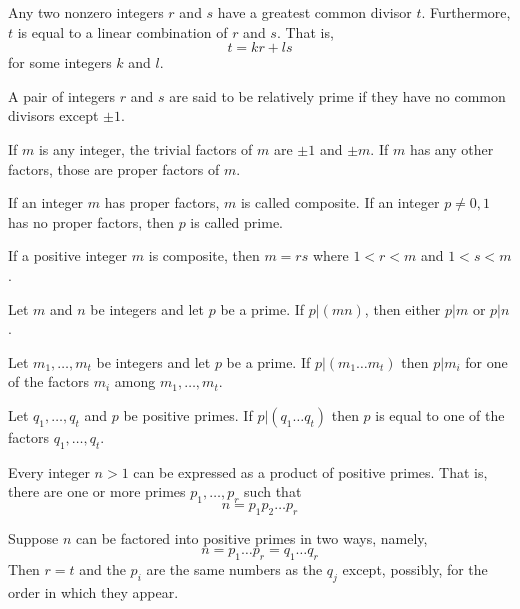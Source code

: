 \documentclass[12pt]{article}
\begin{document}
\begin{theorem} Any two nonzero integers $r$ and $s$ have a greatest common divisor $t$. Furthermore, $t$ is equal to a linear combination of $r$ and $s$. That is, $$t = kr + ls$$ for some integers $k$ and $l$. \end{theorem} 

\begin{definition} A pair of integers $r$ and $s$ are said to be relatively prime if they have no common divisors except $\pm 1$. \end{definition} 

\begin{definition} If $m$ is any integer, the trivial factors of $m$ are $\pm 1$ and $\pm m$. If $m$ has any other factors, those are proper factors of $m$. \end{definition} 

\begin{definition} If an integer $m$ has proper factors, $m$ is called composite. If an integer $p \neq 0, 1$ has no proper factors, then $p$ is called prime. \end{definition} 

\begin{theorem} If a positive integer $m$ is composite, then $m = rs$ where $1 < r < m$ and $1 < s < m$. \end{theorem} 

\begin{theorem} Let $m$ and $n$ be integers and let $p$ be a prime. If $p| (mn)$, then either $p|m$ or $p|n$. \end{theorem} 

\begin{theorem} Let $m_1, \dots, m_t$ be integers and let $p$ be a prime. If $p|(m_1 \dots m_t)$ then $p|m_i$ for one of the factors $m_i$ among $m_1, \dots, m_t$. \end{theorem} 

\begin{theorem} Let $q_1, \dots, q_t$ and $p$ be positive primes. If $p|(q_1 \dots q_t)$ then $p$ is equal to one of the factors $q_1, \dots, q_t$. \end{theorem} 

\begin{theorem} Every integer $n > 1$ can be expressed as a product of positive primes. That is, there are one or more primes $p_1, \dots, p_r$ such that $$ n = p_1p_2\dots p_r$$ \end{theorem} 

\begin{theorem} Suppose $n$ can be factored into positive primes in two ways, namely, $$n = p_1\dots p_r = q_1 \dots q_r$$ Then $r = t$ and the $p_i$ are the same numbers as the $q_j$ except, possibly, for the order in which they appear. \end{theorem} 
\end{document}
